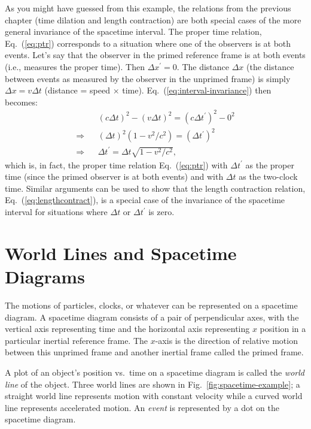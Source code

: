 As you might have guessed from this example, the relations from the
previous chapter (time dilation and length contraction) are both
special cases of the more general invariance of the spacetime
interval.  The proper time relation, Eq.~(\ref{eq:ptr}) corresponds to
a situation where one of the observers is at both events.  Let's say
that the observer in the primed reference frame is at both events
(i.e., measures the proper time).  Then $\Delta x^\prime = 0$.  The
distance $\Delta x$ (the distance between events as measured by the observer
in the unprimed frame) is simply $\Delta x = v\Delta t$ 
(distance = speed $\times$ time).
Eq.~(\ref{eq:interval-invariance}) then becomes:
\begin{eqnarray}
&&\left(c\Delta t\right)^2 - \left(v\Delta t\right)^2 = 
       \left(c\Delta t^\prime\right)^2 -  0^2 \nonumber \\
\Rightarrow &&\left(\Delta t\right)^2\left(1-v^2/c^2\right) = 
       \left(\Delta t^\prime\right)^2 \nonumber \\
\Rightarrow &&\Delta t^\prime = \Delta t\sqrt{1-v^2/c^2}, \nonumber 
\end{eqnarray}
which is, in fact, the proper time relation Eq.~(\ref{eq:ptr}) with
$\Delta t^\prime$ as the proper time (since the primed observer is at
both events) and with $\Delta t$ as the two-clock time.  Similar
arguments can be used to show that the length contraction relation,
Eq.~(\ref{eq:lengthcontract}), is a special case of the invariance of
the spacetime interval for situations where $\Delta t$ or $\Delta
t^\prime$ is zero.

\section{World Lines and Spacetime Diagrams}
\label{section:worldlines}

The motions of particles, clocks, or whatever can be represented on a
spacetime diagram.  A spacetime diagram consists of a pair of
perpendicular axes, with the vertical axis representing time and the
horizontal axis representing $x$ position in a particular inertial
reference frame.  The $x$-axis is the direction of relative motion
between this unprimed frame and another inertial frame called the
primed frame.
    
A plot of an object's position vs.\ time on a spacetime diagram is
called the {\em world line} of the object.  Three world lines are
shown in Fig.~\ref{fig:spacetime-example}; a straight world line
represents motion with constant velocity while a curved world line
represents accelerated motion.  An {\em event} is represented by a dot
on the spacetime diagram.
    
